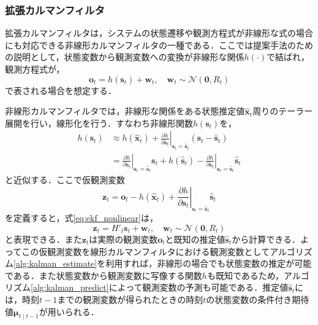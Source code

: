         \subsubsection{拡張カルマンフィルタ}
        拡張カルマンフィルタ\cite{bishop2001introduction}は，システムの状態遷移や観測方程式が非線形な式の場合にも対応できる非線形カルマンフィルタの一種である．ここでは提案手法のための説明として，状態変数から観測変数への変換が非線形な関係$h(\cdot)$で結ばれ，観測方程式が，
        \begin{equation}
            \label{eq:ekf_nonlinear}
            \bm{o}_t = h(\bm{s}_t) + \bm{w}_t, \quad \bm{w}_t \sim \mathcal{N}(\bm{0}, R_t)
        \end{equation}
        で表される場合を想定する．

        非線形カルマンフィルタでは，非線形な関係をある状態推定値$\hat{\bm{x}}_t$周りのテーラー展開を行い，線形化を行う．すなわち非線形関数$h(\bm{s}_t)$を，
        \begin{equation}
            \label{eq:ekf_linearization}
            \begin{aligned}
                h(\bm{s}_t) &\approx h(\hat{\bm{x}}_t) + \left.\frac{\partial h}{\partial \bm{s}_t}\right|_{\bm{s}_t = \hat{\bm{s}}_t} (\bm{s}_t - \hat{\bm{s}}_t)
                \\ &= \left.\frac{\partial h}{\partial \bm{s}_t}\right|_{\bm{s}_t = \hat{\bm{s}}_t} \bm{s}_t + h(\hat{\bm{s}}_t) - \left.\frac{\partial h}{\partial \bm{s}_t}\right|_{\bm{s}_t = \hat{\bm{s}}_t} \hat{\bm{s}}_t
            \end{aligned}
        \end{equation}
        と近似する．ここで仮観測変数
        \begin{equation}
            \label{eq:ekf_new_observation}
            \bm{z}_t = \bm{o}_t - h(\hat{\bm{x}}_t) + \left.\frac{\partial h}{\partial \bm{s}_t}\right|_{\bm{s}_t = \hat{\bm{s}}_t} \hat{\bm{s}}_t
        \end{equation}
        を定義すると，式\ref{eq:ekf_nonlinear}は，
        \begin{equation}
            \label{eq:ekf_linearization_with_z}
            \bm{z}_t = H'_t \bm{s}_t + \bm{w}_t, \quad \bm{w}_t \sim \mathcal{N}(\bm{0}, R_t) 
        \end{equation}
        と表現できる．また$\bm{z}_t$は実際の観測変数$\bm{o}_t$と既知の推定値$\hat{\bm{s}}_t$から計算できる．よってこの仮観測変数を線形カルマンフィルタにおける観測変数としてアルゴリズム\ref{alg:kalman_estimate}を利用すれば，非線形の場合でも状態変数の推定が可能である．また状態変数から観測変数に写像する関数$h$も既知であるため，アルゴリズム\ref{alg:kalman_predict}によって観測変数の予測も可能である．推定値$\hat{\bm{s}}_t$には，時刻$t-1$までの観測変数が得られたときの時刻$t$の状態変数の条件付き期待値$\bm{\mu}_{t \mid t-1}$が用いられる．

